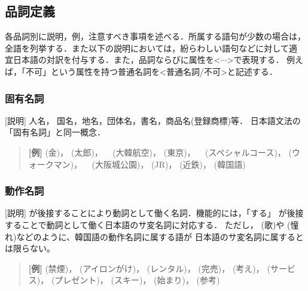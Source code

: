 \subsection{品詞定義}

各品詞別に説明，例，注意すべき事項を述べる．所属する語句が少数の場合は，
全語を列挙する．また以下の説明においては，紛らわしい語句などに対して適
宜日本語の対訳を付与する．また，品詞ならびに属性を<$\cdots$>で表現する．
例えば，「不可」という属性を持つ普通名詞を<普通名詞/不可>と記述する．


\subsubsection{固有名詞}
[説明] 人名， 国名，地名，団体名，書名，商品名(登録商標)等．
日本語文法の「固有名詞」と同一概念．

\begin{quote}        
{\bf [例]} 
(金)，
(太郎)，
\ 
(大韓航空)，
(東京)，
\ 
(スペシャルコース)，
(ウォークマン)，
\ 
(大阪城公園)，
(JR)，
(近鉄)，
(韓国語)
\end{quote}
        

\subsubsection{動作名詞}        

[説明] 
が後接することにより動詞として働く名詞．機能的には，「する」
が後接することで動詞として働く日本語のサ変名詞に対応する．
ただし，
(歌)や
(憧れ)などのように、韓国語の動作名詞に属する語が
日本語のサ変名詞に属するとは限らない。

\begin{quote}
{\bf [例]}
(禁煙)，
(アイロンがけ)，
(レンタル)，
(完売)，
(考え)，
(サービス)，
(プレゼント)，
(スキー)，
(始まり)，
(参考)
\end{quote}

